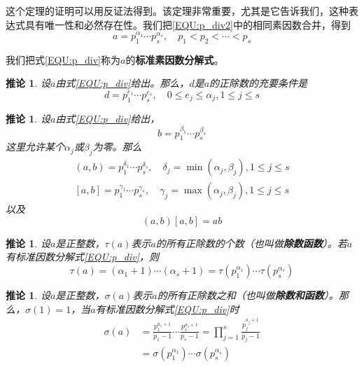 \documentclass{ctexrep}
\newcommand{\bbold}[1]{\textbf{#1}}
\newtheorem{coro}[thrm]{推论}
\begin{document}
这个定理的证明可以用反证法得到。该定理非常重要，尤其是它告诉我们，这种表达式具有唯一性和必然存在性。我们把\ref{EQU:p_div2}中的相同素因数合并，得到
\begin{equation}\label{EQU:p_div}
a=p_1^{\alpha_1} \dotsm p_s^{\alpha_s},\quad p_1<p_2<\dotsb<p_s
\end{equation}

我们把式\ref{EQU:p_div}称为$a$的\bbold{标准素因数分解式}。

\begin{coro}
设$a$由式\ref{EQU:p_div}给出。那么，$d$是$a$的正除数的充要条件是
\begin{equation}
d=p_1^{e_1}\dotsm p_s^{e_s},\quad 0\leq e_j\leq \alpha_j,1\leq j\leq s
\end{equation}
\end{coro}

\begin{coro}
设$a$由式\ref{EQU:p_div}给出，
\begin{displaymath}
b=p_1^{\beta_1}\dotsm p_s^{\beta_s}
\end{displaymath}
这里允许某个$\alpha_j$或$\beta_j$为零。那么
\begin{gather}
(a,b)=p_1^{\delta_1}\dotsm p_s^{\delta_s},\quad \delta_j=\min(\alpha_j,\beta_j),1\leq j\leq s\\
[a,b]=p_1^{\gamma_1}\dotsm p_s^{\gamma_s},\quad \gamma_j=\max(\alpha_j,\beta_j),1\leq j\leq s
\end{gather}
以及
\begin{displaymath}
(a,b)[a,b]=ab
\end{displaymath}
\end{coro}

\begin{coro}
设$a$是正整数，$\tau(a)$表示$a$的所有正除数的个数（也叫做\bbold{除数函数}）。若$a$有标准因数分解式\ref{EQU:p_div}，则
\begin{displaymath}
\tau(a)=(\alpha_1+1)\dotsm(\alpha_s+1)=\tau(p_1^{\alpha_1})\dotsm\tau(p_s^{\alpha_s})
\end{displaymath}
\end{coro}

\begin{coro}
设$a$是正整数，$\sigma(a)$表示$a$的所有正除数之和（也叫做\bbold{除数和函数}）。那么，$\sigma(1)=1$，当$a$有标准因数分解式\ref{EQU:p_div}时
\begin{align}
\sigma(a)&=\frac{p_1^{a_1+1}}{p_1-1}\dotsm\frac{p_s^{a_s+1}}{p_s-1}=\prod_{j=1}^s\frac{p_j^{a_j+1}}{p_j-1}\nonumber \\
         &=\sigma(p_1^{\alpha_1})\dotsm\sigma(p_s^{\alpha_s})
\end{align}
\end{coro}
\end{document}
